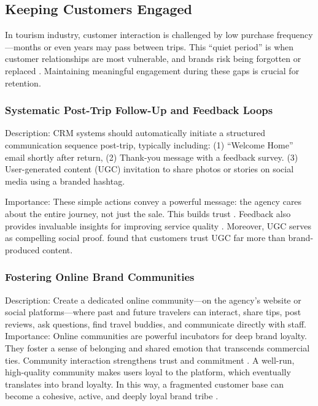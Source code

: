 \subsection{Keeping Customers Engaged}
In tourism industry, customer interaction is challenged by low purchase frequency—months or even years may pass between trips. This “quiet period” is when customer relationships are most vulnerable, and brands risk being forgotten or replaced \cite{huang2022enhancing}. Maintaining meaningful engagement during these gaps is crucial for retention.

\subsubsection{Systematic Post-Trip Follow-Up and Feedback Loops}
Description: CRM systems should automatically initiate a structured communication sequence post-trip, typically including: (1) “Welcome Home” email shortly after return, (2) Thank-you message with a feedback survey. (3) User-generated content (UGC) invitation to share photos or stories on social media using a branded hashtag.

Importance: These simple actions convey a powerful message: the agency cares about the entire journey, not just the sale. This builds trust \cite{dellacorte2015customer}. Feedback also provides invaluable insights for improving service quality \cite{kim2022impact}. Moreover, UGC serves as compelling social proof. \cite{xu2021understanding} found that customers trust UGC far more than brand-produced content.

\subsubsection{Fostering Online Brand Communities}
Description: Create a dedicated online community—on the agency's website or social platforms—where past and future travelers can interact, share tips, post reviews, ask questions, find travel buddies, and communicate directly with staff.
Importance: Online communities are powerful incubators for deep brand loyalty. They foster a sense of belonging and shared emotion that transcends commercial ties. Community interaction strengthens trust and commitment \cite{guan2022net}. A well-run, high-quality community makes users loyal to the platform, which eventually translates into brand loyalty. In this way, a fragmented customer base can become a cohesive, active, and deeply loyal brand tribe \cite{bui2014importance}. 

